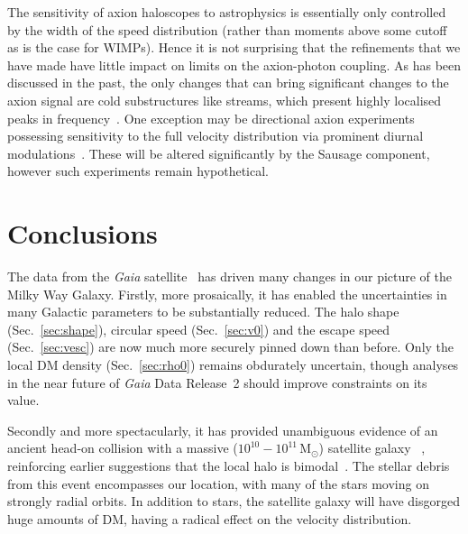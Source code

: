 \documentclass[prd,10pt,twocolumn,showpacs,nofootinbib, aps,superscriptaddress,preprintnumbers]{revtex4-1}
\newcommand{\Msol}{\, \textrm{M}_\odot}
\begin{document}
The sensitivity of axion haloscopes to astrophysics is essentially only controlled by the width of the speed distribution 
(rather than moments above some cutoff as is the case for WIMPs). Hence it is not surprising that the refinements that 
we have made have little impact on limits on the axion-photon coupling. As has been discussed in the past, 
the only changes that can bring significant changes to the axion signal are cold substructures like streams, 
which present highly localised peaks in frequency~\cite{OHare:2017yze,Foster:2017hbq,Knirck:2018knd,OHare:2018trr}. 
One exception may be directional axion experiments possessing sensitivity to the full velocity distribution via prominent diurnal modulations~\cite{Irastorza:2012jq,Knirck:2018knd}. 
These will be altered significantly by the Sausage component, however such experiments remain hypothetical.

\section{Conclusions}\label{sec:conc}

The data from the \emph{Gaia} satellite~\cite{GaiaDR2} has driven many
changes in our picture of the Milky Way Galaxy. Firstly, more
prosaically, it has enabled the uncertainties in many Galactic
parameters to be substantially reduced. The halo shape
(Sec.~\ref{sec:shape}), circular speed (Sec.~\ref{sec:v0}) and the
escape speed (Sec.~\ref{sec:vesc}) are now much more securely pinned
down than before. Only the local DM density (Sec.~\ref{sec:rho0})
remains obdurately uncertain, though analyses in the near future of
\emph{Gaia} Data Release~2 should improve constraints on its value.


 Secondly and more spectacularly, it has provided unambiguous evidence
 of an ancient head-on collision with a massive
 ($10^{10}-10^{11}\Msol$) satellite galaxy
 ~\cite{Kr18,My18,Be18,Ma18}, reinforcing earlier suggestions that the
 local halo is bimodal~\cite{Ca07}. The stellar debris from this event
 encompasses our location, with many of the stars moving on strongly
 radial orbits. In addition to stars, the satellite galaxy will have
 disgorged huge amounts of DM, having a radical effect on the velocity
 distribution.
\end{document}
